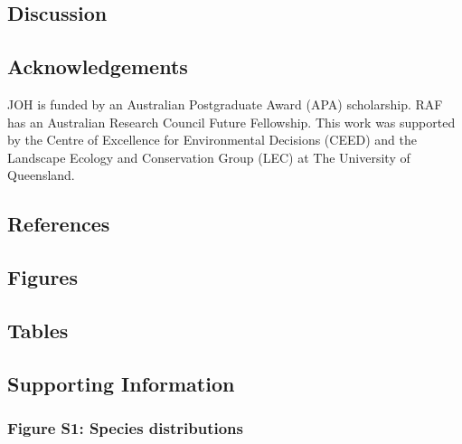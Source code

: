\documentclass[11pt,]{article}
\begin{document}
\subsection{Discussion}\label{discussion}

\subsection{Acknowledgements}\label{acknowledgements}

JOH is funded by an Australian Postgraduate Award (APA) scholarship. RAF
has an Australian Research Council Future Fellowship. This work was
supported by the Centre of Excellence for Environmental Decisions (CEED)
and the Landscape Ecology and Conservation Group (LEC) at The University
of Queensland.

\subsection{References}\label{references}

\subsection{Figures}\label{figures}

\subsection{Tables}\label{tables}

\subsection{Supporting Information}\label{supporting-information}

\subsubsection{Figure S1: Species
distributions}\label{figure-s1-species-distributions}
\end{document}
